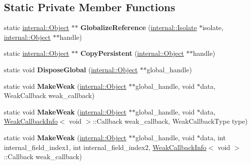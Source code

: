 \subsection*{Static Private Member Functions}
\begin{DoxyCompactItemize}
\item 
static \hyperlink{classv8_1_1internal_1_1_object}{internal\+::\+Object} $\ast$$\ast$ {\bfseries Globalize\+Reference} (\hyperlink{classv8_1_1internal_1_1_isolate}{internal\+::\+Isolate} $\ast$isolate, \hyperlink{classv8_1_1internal_1_1_object}{internal\+::\+Object} $\ast$$\ast$handle)\hypertarget{classv8_1_1_v8_a52974509da51abefef67cc6b3033334d}{}\label{classv8_1_1_v8_a52974509da51abefef67cc6b3033334d}

\item 
static \hyperlink{classv8_1_1internal_1_1_object}{internal\+::\+Object} $\ast$$\ast$ {\bfseries Copy\+Persistent} (\hyperlink{classv8_1_1internal_1_1_object}{internal\+::\+Object} $\ast$$\ast$handle)\hypertarget{classv8_1_1_v8_ad5bca8ef98bce577e49603d0c0f026a7}{}\label{classv8_1_1_v8_ad5bca8ef98bce577e49603d0c0f026a7}

\item 
static void {\bfseries Dispose\+Global} (\hyperlink{classv8_1_1internal_1_1_object}{internal\+::\+Object} $\ast$$\ast$global\+\_\+handle)\hypertarget{classv8_1_1_v8_ad274247a98f48792c3a004c131fd3bc4}{}\label{classv8_1_1_v8_ad274247a98f48792c3a004c131fd3bc4}

\item 
static void {\bfseries Make\+Weak} (\hyperlink{classv8_1_1internal_1_1_object}{internal\+::\+Object} $\ast$$\ast$global\+\_\+handle, void $\ast$data, Weak\+Callback weak\+\_\+callback)\hypertarget{classv8_1_1_v8_a5d1d485f87439bb2672aa04527e17e73}{}\label{classv8_1_1_v8_a5d1d485f87439bb2672aa04527e17e73}

\item 
static void {\bfseries Make\+Weak} (\hyperlink{classv8_1_1internal_1_1_object}{internal\+::\+Object} $\ast$$\ast$global\+\_\+handle, void $\ast$data, \hyperlink{classv8_1_1_weak_callback_info}{Weak\+Callback\+Info}$<$ void $>$\+::Callback weak\+\_\+callback, Weak\+Callback\+Type type)\hypertarget{classv8_1_1_v8_a74319e4d5f53b2f9561aaadad23f7687}{}\label{classv8_1_1_v8_a74319e4d5f53b2f9561aaadad23f7687}

\item 
static void {\bfseries Make\+Weak} (\hyperlink{classv8_1_1internal_1_1_object}{internal\+::\+Object} $\ast$$\ast$global\+\_\+handle, void $\ast$data, int internal\+\_\+field\+\_\+index1, int internal\+\_\+field\+\_\+index2, \hyperlink{classv8_1_1_weak_callback_info}{Weak\+Callback\+Info}$<$ void $>$\+::Callback weak\+\_\+callback)\hypertarget{classv8_1_1_v8_a13f3a1a9fac45df190cef60f0005a373}{}\label{classv8_1_1_v8_a13f3a1a9fac45df190cef60f0005a373}


\end{DoxyCompactItemize}
